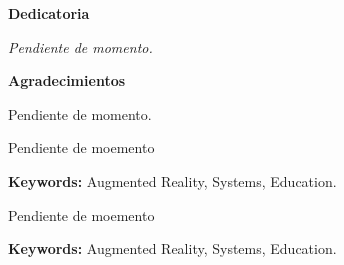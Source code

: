 \newpage
\setcounter{page}{1}

\vspace*{7cm}

\begin{flushright}
\begin{minipage}{0.6\textwidth}
\raggedright 
{\large\textbf{Dedicatoria}}\par\vspace{0.5cm}
\itshape
Pendiente de momento.
\end{minipage}
\end{flushright}

\newpage
{}

\vspace*{4cm}

\begin{flushright}
\begin{minipage}{0.6\textwidth}
\raggedright 
{\large\textbf{Agradecimientos}}\par\vspace{0.5cm}

Pendiente de momento.
\end{minipage}
\end{flushright}

\newpage
{}

\vspace*{\fill}

\begin{center}
\begin{minipage}{0.85\textwidth}
\par\vspace{0.6cm}

\begin{justify} 
Pendiente de moemento
\end{justify}

\vspace{0.6cm}
\noindent\textbf{Keywords:} Augmented Reality, Systems, Education.
\end{minipage}
\end{center}

\vspace*{\fill}

\newpage
{}

\vspace*{\fill}

\begin{center}
\begin{minipage}{0.85\textwidth}
\par\vspace{0.6cm}

\begin{justify} 
Pendiente de moemento
\end{justify}

\vspace{0.6cm}
\noindent\textbf{Keywords:} Augmented Reality, Systems, Education.
\end{minipage}
\end{center}

\vspace*{\fill}